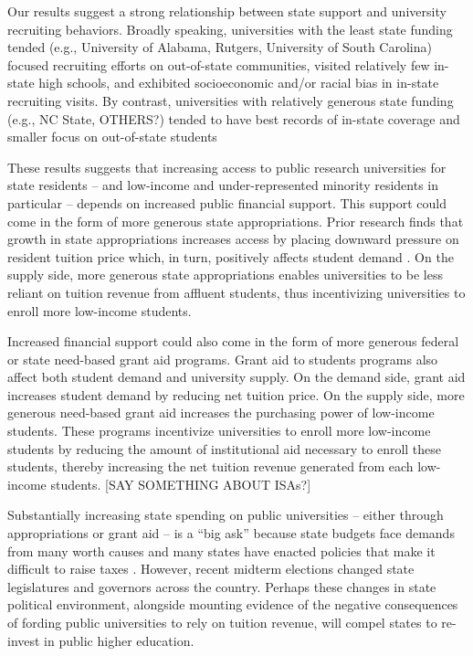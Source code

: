 \documentclass[twoside]{article}
\begin{document}
Our results suggest a strong relationship between state support and university recruiting behaviors.  Broadly speaking, universities with the least state funding tended (e.g., University of Alabama, Rutgers, University of South Carolina) focused recruiting efforts on out-of-state communities, visited relatively few in-state high schools, and exhibited socioeconomic and/or racial bias in in-state recruiting visits.  By contrast, universities with relatively generous state funding (e.g., NC State, OTHERS?) tended to have best records of in-state coverage and smaller focus on out-of-state students

These results suggests that increasing access to public research universities for state residents -- and low-income and under-represented minority residents in particular -- depends on increased public financial support.  This support could come in the form of more generous state appropriations.  Prior research finds that growth in state appropriations increases access by placing downward pressure on resident tuition price \citep{RN2609} which, in turn, positively affects student demand \citep{RN3068}.  On the supply side, more generous state appropriations enables universities to be less reliant on tuition revenue from affluent students, thus incentivizing universities to enroll more low-income students.

Increased financial support could also come in the form of more generous federal or state need-based grant aid programs.  Grant aid to students programs also affect both student demand and university supply. On the demand side, grant aid increases student demand by reducing net tuition price.  On the supply side, more generous need-based grant aid increases the purchasing power of low-income students. These programs incentivize universities to enroll more low-income students by reducing the amount of institutional aid necessary to enroll these students, thereby increasing the net tuition revenue generated from each low-income students.
[SAY SOMETHING ABOUT ISAs?]

Substantially increasing state spending on public universities -- either through appropriations or grant aid -- is a ``big ask'' because state budgets face demands from many worth causes \citep{RN1652} and many states have enacted policies that make it difficult to raise taxes \citep{RN1646}.  However, recent midterm elections changed state legislatures and governors across the country.  Perhaps these changes in state political environment, alongside mounting evidence of the negative consequences of fording public universities to rely on tuition revenue, will compel states to re-invest in public higher education.
\end{document}
